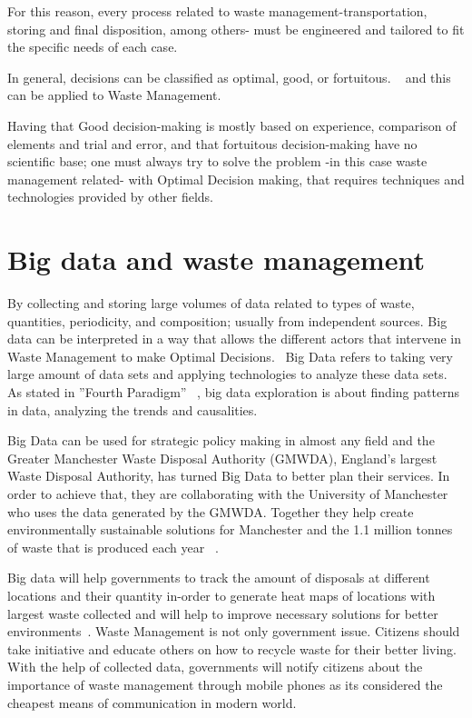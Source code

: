 \documentclass[sigconf]{acmart}
\begin{document}
For this reason, every process related to waste management-transportation, storing and final disposition, among others- must be engineered and tailored to fit the specific needs of each case.



In general, decisions can be classified as optimal, good, or fortuitous. ~\cite{akbarpour2016} and this can be applied to Waste Management.

Having that Good decision-making is mostly based on experience, comparison of elements and trial and error, and that fortuitous decision-making have no scientific base; one must always try to solve the problem -in this case waste management related- with Optimal Decision making, that requires techniques and technologies provided by other fields. 
 ~\cite{akbarpour2016}


\section{ Big data and waste management}
By collecting and storing large volumes of  data related to types of waste, quantities, periodicity, and composition; usually from independent sources. Big data can be interpreted in a way that allows the different actors that intervene in Waste Management to make Optimal Decisions.~\cite{yenkar2014review} Big Data refers to taking very large amount of data sets and applying technologies to analyze these data sets. As stated in ''Fourth Paradigm'' ~\cite{hey2009fourth}, big data exploration is about finding patterns in data, analyzing the trends and causalities.

Big Data can be used for strategic policy making in almost any field and the Greater Manchester Waste Disposal Authority (GMWDA), England's largest Waste Disposal Authority, has turned Big Data to better plan their services. In order to achieve that, they are collaborating with the University of Manchester who uses the data generated by the GMWDA. Together they help create environmentally sustainable solutions for Manchester and the 1.1 million tonnes of waste that is produced each year ~\cite{markvan2016}. 

Big data will help governments to track the amount of disposals at different locations and their quantity in-order to generate heat maps of locations with largest waste collected and will help to improve necessary solutions for better environments~\cite{markvan2016}. Waste Management is not only government issue. Citizens should take initiative and educate others on how to recycle waste for their better living. With the help of collected data, governments will notify citizens about the importance of waste management through mobile phones as its considered the cheapest means of communication in modern world.
\end{document}
